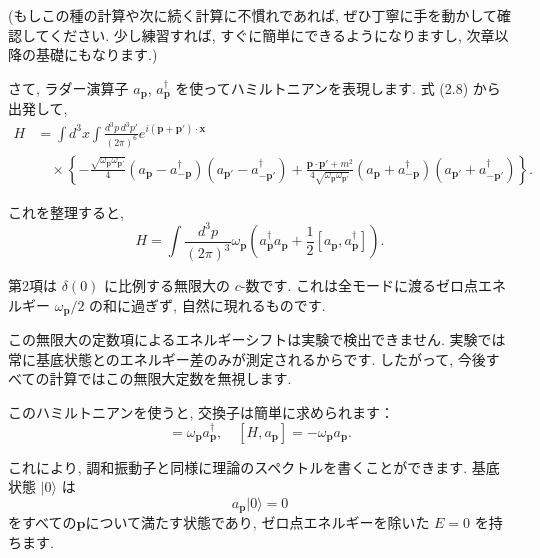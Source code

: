 \documentclass[a4paper,12pt]{article}
\begin{document}
(もしこの種の計算や次に続く計算に不慣れであれば, ぜひ丁寧に手を動かして確認してください.  
少し練習すれば, すぐに簡単にできるようになりますし, 次章以降の基礎にもなります.)

\vspace{0.5em}

さて, ラダー演算子 $a_{\mathbf{p}}$, $a^\dagger_{\mathbf{p}}$ を使ってハミルトニアンを表現します.  
式 (2.8) から出発して,
\begin{align*}
H &= \int d^3x \int \frac{d^3p\, d^3p'}{(2\pi)^6} e^{i(\mathbf{p}+\mathbf{p}')\cdot\mathbf{x}} \\
&\quad \times \left\{ -\frac{\sqrt{\omega_{\mathbf{p}}\omega_{\mathbf{p}'}}}{4} (a_{\mathbf{p}} - a^\dagger_{-\mathbf{p}})(a_{\mathbf{p}'} - a^\dagger_{-\mathbf{p}'})
+ \frac{\mathbf{p}\cdot\mathbf{p}' + m^2}{4\sqrt{\omega_{\mathbf{p}}\omega_{\mathbf{p}'}}} (a_{\mathbf{p}} + a^\dagger_{-\mathbf{p}})(a_{\mathbf{p}'} + a^\dagger_{-\mathbf{p}'}) \right\} .
\end{align*}

これを整理すると,
\begin{equation*}
H = \int \frac{d^3p}{(2\pi)^3} \omega_{\mathbf{p}} \left( a^\dagger_{\mathbf{p}} a_{\mathbf{p}} + \frac{1}{2} [a_{\mathbf{p}}, a^\dagger_{\mathbf{p}}] \right) .
\end{equation*}

第2項は $\delta(0)$ に比例する無限大の $c$-数です.  
これは全モードに渡るゼロ点エネルギー $\omega_{\mathbf{p}}/2$ の和に過ぎず, 自然に現れるものです.

\vspace{0.5em}

この無限大の定数項によるエネルギーシフトは実験で検出できません.  
実験では常に基底状態とのエネルギー差のみが測定されるからです.  
したがって, 今後すべての計算ではこの無限大定数を無視します.

\vspace{0.5em}

このハミルトニアンを使うと, 交換子は簡単に求められます：
\begin{equation*}
[H, a^\dagger_{\mathbf{p}}] = \omega_{\mathbf{p}} a^\dagger_{\mathbf{p}} , \quad
[H, a_{\mathbf{p}}] = -\omega_{\mathbf{p}} a_{\mathbf{p}} .
\end{equation*}

これにより, 調和振動子と同様に理論のスペクトルを書くことができます.  
基底状態 $\lvert 0 \rangle$ は
\begin{equation*}
a_{\mathbf{p}} \lvert 0 \rangle = 0
\end{equation*}
をすべての$\mathbf{p}$について満たす状態であり, ゼロ点エネルギーを除いた $E=0$ を持ちます.
\end{document}
